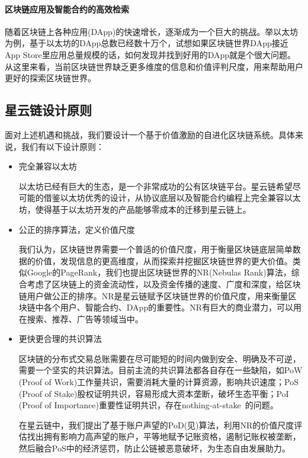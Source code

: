 \paragraph{区块链应用及智能合约的高效检索}随着区块链上各种应用(DApp)的快速增长，逐渐成为一个巨大的挑战。举以太坊为例，基于以太坊的DApp总数已经数十万个，试想如果区块链世界DApp接近App Store里应用总量规模的话，如何发现并找到好用的DApp就是个很大问题。从这里来看，当前区块链世界缺乏更多维度的信息和价值评判尺度，用来帮助用户更好的探索区块链世界。

\subsection{星云链设计原则}
面对上述机遇和挑战，我们要设计一个基于价值激励的自进化区块链系统。具体来说，我们有以下设计原则：
\begin{itemize}
	\item 完全兼容以太坊

以太坊已经有巨大的生态，是一个非常成功的公有区块链平台。星云链希望尽可能的借鉴以太坊优秀的设计，从协议底层以及智能合约编程上完全兼容以太坊，使得基于以太坊开发的产品能够零成本的迁移到星云链上。

	\item 公正的排序算法，定义价值尺度

我们认为，区块链世界需要一个普适的价值尺度，用于衡量区块链底层简单数据的价值，发现信息的更高维度，从而探索并挖掘区块链世界的更大价值。类似Google的PageRank\cite{Brin2010}\cite{page1999pagerank}，我们也提出区块链世界的NR(Nebulas Rank)算法，综合考虑了区块链上的资金流动性，以及资金传播的速度、广度和深度，给区块链用户做公正的排序。NR是星云链赋予区块链世界的价值尺度，用来衡量区块链中各个用户、智能合约、DApp的重要性。NR有巨大的商业潜力，可以用在搜索、推荐、广告等领域当中。

	\item 更快更合理的共识算法

区块链的分布式交易总账需要在尽可能短的时间内做到安全、明确及不可逆，需要一个坚实的共识算法。目前主流的共识算法都各自存在一些缺陷，如PoW (Proof of Work)工作量共识，需要消耗大量的计算资源，影响共识速度；PoS (Proof of Stake)股权证明共识，容易形成大资本垄断，破坏生态平衡；PoI (Proof of Importance)重要性证明共识，存在nothing-at-stake~\cite{nothingatstake}的问题。 

在星云链中，我们提出了基于账户声望的PoD(见)算法，利用NR的价值尺度评估找出拥有影响力高声望的账户，平等地赋予记账资格，遏制记账权被垄断，然后融合PoS中的经济惩罚，防止公链被恶意破坏，为生态自由发展助力。


\end{itemize}
